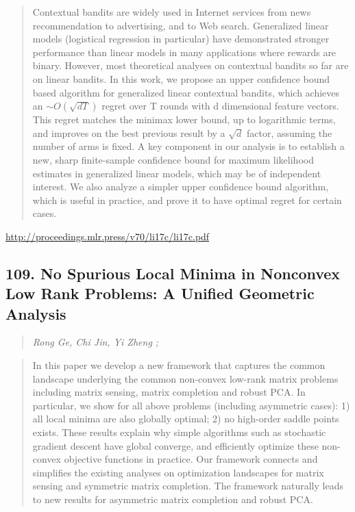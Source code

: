 \documentclass{article}
\begin{document}
\begin{quote}
    Contextual bandits are widely used in Internet services from news recommendation to advertising, and to Web search. Generalized linear models (logistical regression in particular) have demonstrated stronger performance than linear models in many applications where rewards are binary. However, most theoretical analyses on contextual bandits so far are on linear bandits. In this work, we propose an upper confidence bound based algorithm for generalized linear contextual bandits, which achieves an $\sim O(\sqrt{dT})$ regret over T rounds with d dimensional feature vectors. This regret matches the minimax lower bound, up to logarithmic terms, and improves on the best previous result by a $\sqrt{d}$ factor, assuming the number of arms is fixed. A key component in our analysis is to establish a new, sharp finite-sample confidence bound for maximum likelihood estimates in generalized linear models, which may be of independent interest. We also analyze a simpler upper confidence bound algorithm, which is useful in practice, and prove it to have optimal regret for certain cases.  
\end{quote}

\href{http://proceedings.mlr.press/v70/li17c/li17c.pdf}{http://proceedings.mlr.press/v70/li17c/li17c.pdf}

\subsection{109. No Spurious Local Minima in Nonconvex Low Rank Problems: A Unified Geometric Analysis}

\begin{quote}
\footnotesize{\textit{Rong Ge, Chi Jin, Yi Zheng ;}}

\end{quote}

\begin{quote}
    In this paper we develop a new framework that captures the common landscape underlying the common non-convex low-rank matrix problems including matrix sensing, matrix completion and robust PCA. In particular, we show for all above problems (including asymmetric cases): 1) all local minima are also globally optimal; 2) no high-order saddle points exists. These results explain why simple algorithms such as stochastic gradient descent have global converge, and efficiently optimize these non-convex objective functions in practice. Our framework connects and simplifies the existing analyses on optimization landscapes for matrix sensing and symmetric matrix completion. The framework naturally leads to new results for asymmetric matrix completion and robust PCA.  
\end{quote}
\end{document}
